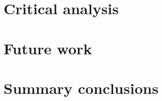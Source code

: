 \chapter{Critical analysis}
\label{ch:analysis}

\chapter{Future work}
\label{ch:future}

\chapter{Summary conclusions}
\label{ch:conclusion}
